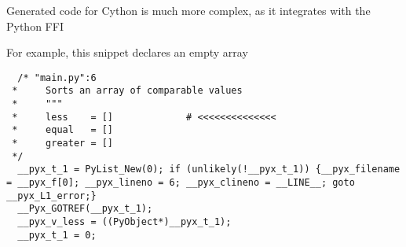 \documentclass{article}
\begin{document}
Generated code for Cython is much more complex, as it integrates with the Python FFI

For example, this snippet declares an empty array

\begin{lstlisting}
  /* "main.py":6
 *     Sorts an array of comparable values
 *     """
 *     less    = []             # <<<<<<<<<<<<<<
 *     equal   = []
 *     greater = []
 */
  __pyx_t_1 = PyList_New(0); if (unlikely(!__pyx_t_1)) {__pyx_filename = __pyx_f[0]; __pyx_lineno = 6; __pyx_clineno = __LINE__; goto __pyx_L1_error;}
  __Pyx_GOTREF(__pyx_t_1);
  __pyx_v_less = ((PyObject*)__pyx_t_1);
  __pyx_t_1 = 0;
\end{lstlisting}

\newpage
\end{document}

